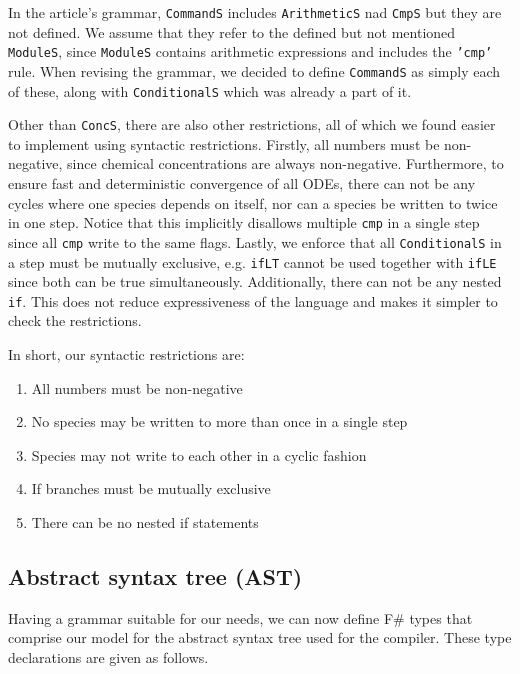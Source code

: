 In the article's grammar, \texttt{CommandS} includes \texttt{ArithmeticS} nad \texttt{CmpS} but they are not defined. We assume that they refer to the defined but not mentioned \texttt{ModuleS}, since \texttt{ModuleS} contains arithmetic expressions and includes the \texttt{'cmp'} rule. When revising the grammar, we decided to define \texttt{CommandS} as simply each of these, along with \texttt{ConditionalS} which was already a part of it. 

Other than \texttt{ConcS}, there are also other restrictions, all of which we found easier to implement using syntactic restrictions. Firstly, all numbers must be non-negative, since chemical concentrations are always non-negative. Furthermore, to ensure fast and deterministic convergence of all ODEs, there can not be any cycles where one species depends on itself, nor can a species be written to twice in one step. Notice that this implicitly disallows multiple \texttt{cmp} in a single step since all \texttt{cmp} write to the same flags. Lastly, we enforce that all \texttt{ConditionalS} in a step must be mutually exclusive, e.g. \texttt{ifLT} cannot be used together with \texttt{ifLE} since both can be true simultaneously. Additionally, there can not be any nested \texttt{if}. This does not reduce expressiveness of the language and makes it simpler to check the restrictions. 

In short, our syntactic restrictions are:
\begin{enumerate}
    \item All numbers must be non-negative
    \item No species may be written to more than once in a single step
    \item Species may not write to each other in a cyclic fashion
    \item If branches must be mutually exclusive
    \item There can be no nested if statements
\end{enumerate}


\subsection{Abstract syntax tree (AST)}
Having a grammar suitable for our needs, we can now define F\# types that comprise our model for the abstract syntax tree used for the compiler. These type declarations are given as follows. 


